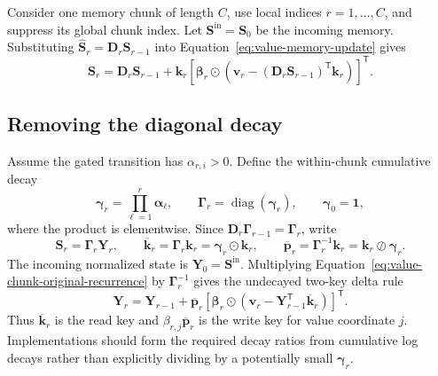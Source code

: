 \documentclass[11pt]{article}
\newcommand{\ve}[1]{\boldsymbol{#1}}
\newcommand{\tr}{\mathsf{T}}
\newcommand{\diag}{\operatorname{diag}}
\begin{document}
Consider one memory chunk of length $C$, use local indices $r=1,\ldots,C$, and suppress its global
chunk index.  Let $\ve{S}^{\mathrm{in}}=\ve{S}_0$ be the incoming memory.  Substituting
$\widehat{\ve{S}}_r=\ve{D}_r\ve{S}_{r-1}$ into
Equation~\eqref{eq:value-memory-update} gives
\begin{equation}
  \ve{S}_r
  =\ve{D}_r\ve{S}_{r-1}
   +\ve{k}_r
    \left[
      \ve{\beta}_r\odot
      \left(
        \ve{v}_r-(\ve{D}_r\ve{S}_{r-1})^{\tr}\ve{k}_r
      \right)
    \right]^{\tr}.
  \label{eq:value-chunk-original-recurrence}
\end{equation}

\subsection{Removing the diagonal decay}
\label{app:value-wise-decay-normalization}

Assume the gated transition has $\alpha_{r,i}>0$.  Define the within-chunk cumulative decay
\begin{equation}
  \ve{\gamma}_r=\prod_{\ell=1}^{r}\ve{\alpha}_\ell,
  \qquad
  \ve{\Gamma}_r=\diag(\ve{\gamma}_r),
  \qquad
  \ve{\gamma}_0=\ve{1},
  \label{eq:value-chunk-cumulative-decay}
\end{equation}
where the product is elementwise.  Since
$\ve{D}_r\ve{\Gamma}_{r-1}=\ve{\Gamma}_r$, write
\begin{equation}
  \ve{S}_r=\ve{\Gamma}_r\ve{Y}_r,
  \qquad
  \overline{\ve{k}}_r=\ve{\Gamma}_r\ve{k}_r
  =\ve{\gamma}_r\odot\ve{k}_r,
  \qquad
  \overline{\ve{p}}_r=\ve{\Gamma}_r^{-1}\ve{k}_r
  =\ve{k}_r\oslash\ve{\gamma}_r.
  \label{eq:value-chunk-normalized-keys}
\end{equation}
The incoming normalized state is $\ve{Y}_0=\ve{S}^{\mathrm{in}}$.  Multiplying
Equation~\eqref{eq:value-chunk-original-recurrence} by $\ve{\Gamma}_r^{-1}$ gives the undecayed
two-key delta rule
\begin{equation}
  \ve{Y}_r
  =\ve{Y}_{r-1}
   +\overline{\ve{p}}_r
    \left[
      \ve{\beta}_r\odot
      \left(
        \ve{v}_r-\ve{Y}_{r-1}^{\tr}\overline{\ve{k}}_r
      \right)
    \right]^{\tr}.
  \label{eq:value-chunk-normalized-recurrence}
\end{equation}
Thus $\overline{\ve{k}}_r$ is the read key and
$\beta_{r,j}\overline{\ve{p}}_r$ is the write key for value coordinate $j$.  Implementations
should form the required decay ratios from cumulative log decays rather than explicitly dividing
by a potentially small $\ve{\gamma}_r$.
\end{document}
